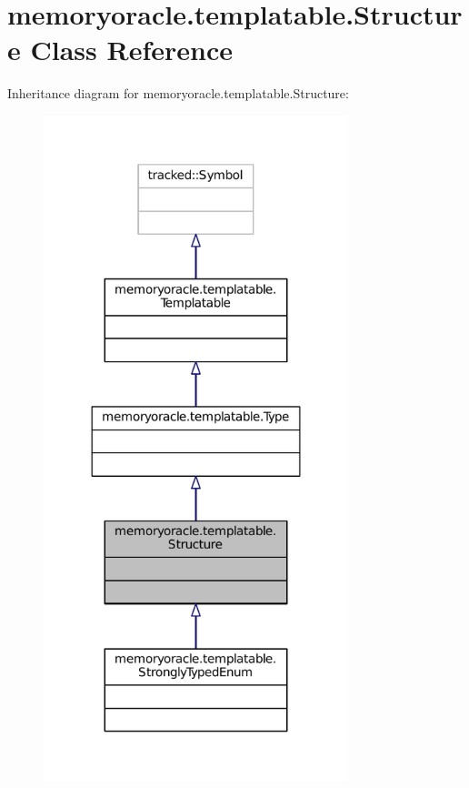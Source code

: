 \hypertarget{classmemoryoracle_1_1templatable_1_1Structure}{}\section{memoryoracle.\+templatable.\+Structure Class Reference}
\label{classmemoryoracle_1_1templatable_1_1Structure}


Inheritance diagram for memoryoracle.\+templatable.\+Structure\+:\nopagebreak
\begin{figure}[H]
\begin{center}
\leavevmode
\includegraphics[width=251pt]{classmemoryoracle_1_1templatable_1_1Structure__inherit__graph}
\end{center}
\end{figure}


